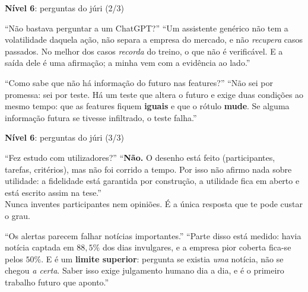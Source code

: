 \documentclass[aspectratio=169]{beamer}
\newcommand{\key}[1]{\textbf{\textcolor{blue!55!black}{#1}}}
\begin{document}
\begin{frame}{\key{Nível 6}: perguntas do júri (2/3)}
\small
\begin{block}{``Não bastava perguntar a um ChatGPT?''}
``Um assistente genérico não tem a volatilidade daquela ação, não separa a empresa do mercado, e não
\emph{recupera} casos passados. No melhor dos casos \emph{recorda} do treino, o que não é
verificável. E a saída dele é uma afirmação; a minha vem com a evidência ao lado.''
\end{block}
\begin{block}{``Como sabe que não há informação do futuro nas features?''}
``Não sei por promessa: sei por teste. Há um teste que altera o futuro e exige duas condições ao
mesmo tempo: que as features fiquem \textbf{iguais} e que o rótulo \textbf{mude}. Se alguma
informação futura se tivesse infiltrado, o teste falha.''
\end{block}
\end{frame}

\begin{frame}{\key{Nível 6}: perguntas do júri (3/3)}
\small
\begin{block}{``Fez estudo com utilizadores?''}
``\textbf{Não.} O desenho está feito (participantes, tarefas, critérios), mas não foi corrido a
tempo. Por isso não afirmo nada sobre utilidade: a fidelidade está garantida por construção, a
utilidade fica em aberto e está escrito assim na tese.''\\
\footnotesize \textcolor{red!60!black}{Nunca inventes participantes nem opiniões. É a única resposta
que te pode custar o grau.}
\end{block}
\begin{block}{``Os alertas parecem falhar notícias importantes.''}
``Parte disso está medido: havia notícia captada em $88{,}5\%$ dos dias invulgares, e a empresa pior
coberta fica-se pelos $50\%$. E é um \textbf{limite superior}: pergunta se existia \emph{uma}
notícia, não se chegou \emph{a certa}. Saber isso exige julgamento humano dia a dia, e é o primeiro
trabalho futuro que aponto.''
\end{block}
\end{frame}
\end{document}
